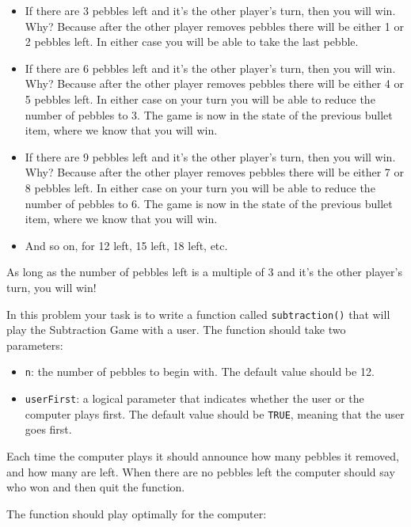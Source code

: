 \documentclass[]{book}
\providecommand{\tightlist}{%
  \setlength{\itemsep}{0pt}\setlength{\parskip}{0pt}}
\theoremstyle{definition}
\theoremstyle{definition}
\theoremstyle{definition}
\theoremstyle{remark}
\begin{document}
{\begin{enumerate}
  \begin{itemize}
  \tightlist
  \item
    If there are 3 pebbles left and it's the other player's turn, then
    you will win. Why? Because after the other player removes pebbles
    there will be either 1 or 2 pebbles left. In either case you will be
    able to take the last pebble.
  \item
    If there are 6 pebbles left and it's the other player's turn, then
    you will win. Why? Because after the other player removes pebbles
    there will be either 4 or 5 pebbles left. In either case on your
    turn you will be able to reduce the number of pebbles to 3. The game
    is now in the state of the previous bullet item, where we know that
    you will win.
  \item
    If there are 9 pebbles left and it's the other player's turn, then
    you will win. Why? Because after the other player removes pebbles
    there will be either 7 or 8 pebbles left. In either case on your
    turn you will be able to reduce the number of pebbles to 6. The game
    is now in the state of the previous bullet item, where we know that
    you will win.
  \item
    And so on, for 12 left, 15 left, 18 left, etc.
  \end{itemize}

  As long as the number of pebbles left is a multiple of 3 and it's the
  other player's turn, you will win!

  In this problem your task is to write a function called
  \texttt{subtraction()} that will play the Subtraction Game with a
  user. The function should take two parameters:

  \begin{itemize}
  \tightlist
  \item
    \texttt{n}: the number of pebbles to begin with. The default value
    should be 12.
  \item
    \texttt{userFirst}: a logical parameter that indicates whether the
    user or the computer plays first. The default value should be
    \texttt{TRUE}, meaning that the user goes first.
  \end{itemize}

  Each time the computer plays it should announce how many pebbles it
  removed, and how many are left. When there are no pebbles left the
  computer should say who won and then quit the function.

  The function should play optimally for the computer:


\end{enumerate}}
\end{document}
